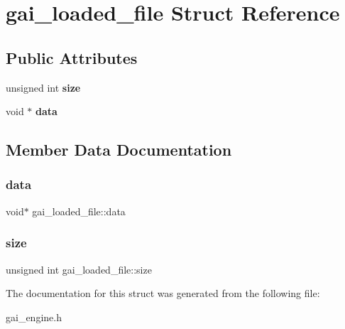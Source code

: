 \hypertarget{structgai__loaded__file}{}\section{gai\+\_\+loaded\+\_\+file Struct Reference}
\label{structgai__loaded__file}
\subsection*{Public Attributes}
\begin{DoxyCompactItemize}
\item 
\mbox{\label{structgai__loaded__file_a16e4244cb0fba12420c0499828c0dfec}} 
unsigned int {\bfseries size}
\item 
\mbox{\label{structgai__loaded__file_a701c480c708004b79c5028835816554c}} 
void $\ast$ {\bfseries data}
\end{DoxyCompactItemize}


\subsection{Member Data Documentation}
\mbox{\label{structgai__loaded__file_a701c480c708004b79c5028835816554c}} 
\subsubsection{\texorpdfstring{data}{data}}
{\footnotesize\ttfamily void$\ast$ gai\+\_\+loaded\+\_\+file\+::data}

\mbox{\label{structgai__loaded__file_a16e4244cb0fba12420c0499828c0dfec}} 
\subsubsection{\texorpdfstring{size}{size}}
{\footnotesize\ttfamily unsigned int gai\+\_\+loaded\+\_\+file\+::size}



The documentation for this struct was generated from the following file\+:\begin{DoxyCompactItemize}
\item 
gai\+\_\+engine.\+h\end{DoxyCompactItemize}
